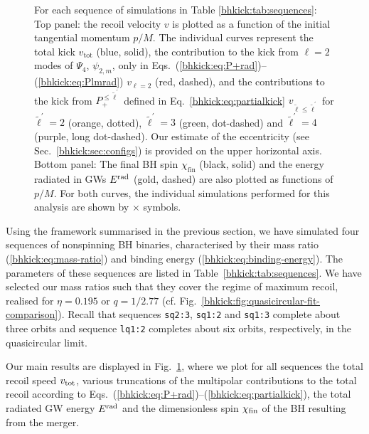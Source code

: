 \begin{figure}[t!]
{    }
    \caption{For each sequence of simulations in Table \ref{bhkick:tab:sequences}:
    Top panel: the recoil velocity $v$ is plotted as a function
    of the initial tangential momentum $p/M$. The individual curves
    represent the total kick $v_\mathrm{tot}$ (blue, solid), the
    contribution to the kick from $\ell=2$ modes of $\Psi_4$, $\psi_{2,m}$,
    only in Eqs.~(\ref{bhkick:eq:P+rad})--(\ref{bhkick:eq:Plmrad}) $v_{\ell=2}$
    (red, dashed), and the contributions to the kick from
    $P_+^{\leq \tilde{\ell}^\prime}$ defined in Eq.~\eqref{bhkick:eq:partialkick}
    $v_{\tilde{\ell}\leq\tilde{\ell}^\prime} $ for $\tilde{\ell}^\prime=2$
    (orange, dotted), $\tilde{\ell}^\prime=3$ (green, dot-dashed)
    and $\tilde{\ell}^\prime=4$ (purple, long dot-dashed).
    Our estimate of the eccentricity (see Sec.~\ref{bhkick:sec:configs}) is
    provided on the upper horizontal axis.
    Bottom panel: The final BH spin $\chi_{\mathrm{fin}}$
    (black, solid) and the energy radiated in GWs $E^{\mathrm{rad}}$ (gold, dashed)
    are also plotted as functions of $p/M$. For both curves, the
    individual simulations performed for this analysis are shown by
    $\times$ symbols.}
    \label{bhkick:fig:kicks2}
\end{figure}
%
Using the framework summarised in the previous section,
we have simulated four sequences of nonspinning BH binaries,
characterised by their mass ratio (\ref{bhkick:eq:mass-ratio})
and binding energy (\ref{bhkick:eq:binding-energy}).
The parameters of these sequences are listed in Table~\ref{bhkick:tab:sequences}.
We have selected our mass ratios such that they cover the
regime of maximum recoil, realised for $\eta=0.195$ or
$q=1/2.77$ (cf. Fig.~\ref{bhkick:fig:quasicircular-fit-comparison}).
Recall that sequences \texttt{sq2:3}, \texttt{sq1:2} and \texttt{sq1:3}
complete about three orbits and sequence \texttt{lq1:2} completes
about six orbits, respectively, in the quasicircular limit.

Our main results are displayed in Fig.~\ref{bhkick:fig:kicks2}, where we plot
for all sequences the total recoil speed $v_{\rm tot}$, various
truncations of the multipolar contributions to the total recoil
according to Eqs.~(\ref{bhkick:eq:P+rad})--(\ref{bhkick:eq:partialkick}), the
total radiated GW energy $E^{\rm rad}$ and the dimensionless spin
$\chi_{\rm fin}$ of the BH resulting from the merger.

